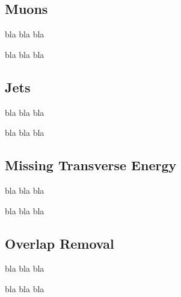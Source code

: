 		\subsection{Muons}

			bla bla bla 

			bla bla bla 


		\subsection{Jets}

			bla bla bla 

			bla bla bla 


		\subsection{Missing Transverse Energy}

			bla bla bla 

			bla bla bla 


		\subsection{Overlap Removal}

			bla bla bla 

			bla bla bla 


